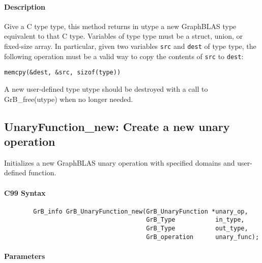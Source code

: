 \paragraph{Description}
Give a C type {\sf type}, this method returns in {\sf utype} a new GraphBLAS type equivalent to that C type.
Variables of type {\sf type} must be a struct, union, or fixed-size array. In particular, given two variables
{\tt src} and {\tt dest} of type {\sf type}, the following operation must be a valid way to copy the contents of
{\tt src} to {\tt dest}:

\begin{center}
{\tt memcpy(\&dest, \&src, sizof({\sf type}))}
\end{center}

A new user-defined type {\sf utype} should be destroyed with a call to {\sf GrB\_free(utype)} when no longer needed.

\subsection{{\sf UnaryFunction\_new}: Create a new unary operation}

Initializes a new GraphBLAS unary operation with specified domains and user-defined function.


\paragraph{C99 Syntax}

\begin{verbatim}
        GrB_info GrB_UnaryFunction_new(GrB_UnaryFunction *unary_op,
                                       GrB_Type           in_type,
                                       GrB_Type           out_type,
                                       GrB_operation      unary_func);
\end{verbatim}

\paragraph{Parameters}

